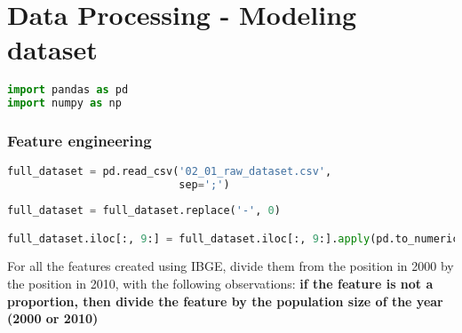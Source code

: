 \section{Data Processing - Modeling dataset}\label{ape:data_processing_modeling_dataset}

\begin{lstlisting}[language=Python]
import pandas as pd
import numpy as np
\end{lstlisting}

\subsubsection{Feature engineering}\label{feature-engineering}

\begin{lstlisting}[language=Python]
full_dataset = pd.read_csv('02_01_raw_dataset.csv',
                           sep=';')
\end{lstlisting}

\begin{lstlisting}[language=Python]
full_dataset = full_dataset.replace('-', 0)

full_dataset.iloc[:, 9:] = full_dataset.iloc[:, 9:].apply(pd.to_numeric)
\end{lstlisting}

For all the features created using IBGE, divide them from the position
in 2000 by the position in 2010, with the following observations:
\textbf{if the feature is not a proportion, then divide the feature by
the population size of the year (2000 or 2010)}

